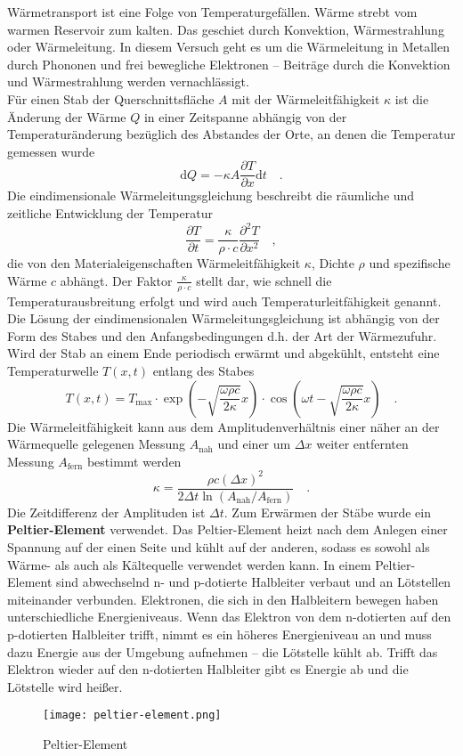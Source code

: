 Wärmetransport ist eine Folge von Temperaturgefällen. Wärme strebt vom warmen Reservoir zum kalten. Das geschiet durch Konvektion, Wärmestrahlung oder Wärmeleitung. In diesem Versuch geht es um die Wärmeleitung in Metallen durch Phononen und frei bewegliche Elektronen -- Beiträge durch die Konvektion und Wärmestrahlung werden vernachlässigt. \\
Für einen Stab der Querschnittsfläche $A$ mit der Wärmeleitfähigkeit $\kappa$ ist die Änderung der Wärme $Q$ in einer Zeitspanne abhängig von der Temperaturänderung bezüglich des Abstandes der Orte, an denen die Temperatur gemessen wurde
\begin{equation}\label{Warmestrom}
\text{d}Q = - \kappa A \frac{\partial T}{\partial x} \text{d}t \quad .
\end{equation}
Die eindimensionale Wärmeleitungsgleichung beschreibt die räumliche und zeitliche Entwicklung der Temperatur
\begin{equation}
\frac{\partial T}{\partial t} = \frac{\kappa}{\rho \cdot c} \frac{\partial ^2 T}{\partial x^2} \quad,
\end{equation}
die von den Materialeigenschaften Wärmeleitfähigkeit $\kappa$, Dichte $\rho$ und spezifische Wärme $c$ abhängt.  Der Faktor $\frac{\kappa}{\rho \cdot c}$ stellt dar, wie schnell die Temperaturausbreitung erfolgt und wird auch Temperaturleitfähigkeit genannt. \\
Die Lösung der eindimensionalen Wärmeleitungsgleichung ist abhängig von der Form des Stabes und den Anfangsbedingungen d.h. der Art der Wärmezufuhr. Wird der Stab an einem Ende periodisch erwärmt und abgekühlt, entsteht eine Temperaturwelle $T(x,t)$ entlang des Stabes 
\begin{equation}\label{Welle}
T(x,t) = T_\text{max} \cdot \exp\left( - \sqrt{\frac{\omega \rho c}{2 \kappa}}x\right) \cdot \cos \left(\omega t - \sqrt{\frac{\omega \rho c}{2 \kappa}}x\right) \quad.
\end{equation}
Die Wärmeleitfähigkeit kann aus dem Amplitudenverhältnis einer näher an der Wärmequelle gelegenen Messung $A_\text{nah}$ und einer um $\Delta x$ weiter entfernten Messung $A_\text{fern}$ bestimmt werden
\begin{equation}\label{Warmekappazitat}
\kappa = \frac{\rho  c (\Delta x )^2}{2  \Delta t \ln \left(A_\text{nah} / A_\text{fern}\right)} \quad.
\end{equation}
Die Zeitdifferenz der Amplituden ist $\Delta t$. \newpage
Zum Erwärmen der Stäbe wurde ein \textbf{Peltier-Element} verwendet. Das Peltier-Element heizt nach dem Anlegen einer Spannung auf der einen Seite und kühlt auf der anderen, sodass es sowohl als Wärme- als auch als Kältequelle verwendet werden kann. In einem Peltier-Element sind abwechselnd n- und p-dotierte Halbleiter verbaut und an Lötstellen miteinander verbunden. Elektronen, die sich in den Halbleitern bewegen haben unterschiedliche Energieniveaus. Wenn das Elektron von dem n-dotierten auf den p-dotierten Halbleiter trifft, nimmt es ein höheres Energieniveau an und muss dazu Energie aus der Umgebung aufnehmen -- die Lötstelle kühlt ab. Trifft  das Elektron wieder auf den n-dotierten Halbleiter gibt es Energie ab und die Lötstelle wird heißer.
\begin{figure}
	\centering
\texttt{[image: peltier-element.png]}		
\caption[Peltier-Element]{Peltier-Element\footnotemark}
\end{figure}


